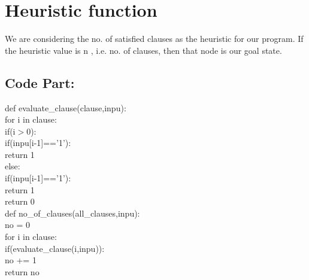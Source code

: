 \documentclass{article}
\begin{document}
\section{Heuristic function}
\vspace{10pt}
We are considering the no. of satisfied clauses as the heuristic for our program.
If the heuristic value is n , i.e. no. of clauses, then that node is our goal state.
\subsection*{Code Part:}
\vspace{5pt}
    def evaluate\_clause(clause,inpu):
        \vspace{2pt}
        \\ \hspace*{20pt}for i in clause:
        \vspace{2pt}
        \\ \hspace*{30pt}if(i$>$0):
        \vspace{2pt}
        \\ \hspace*{50pt} if(inpu[i-1]=='1'):
        \vspace{2pt}
        \\ \hspace*{70pt} return 1
        \vspace{2pt}
        \\ \hspace*{30pt} else:
        \vspace{2pt}
        \\ \hspace*{50pt} if(inpu[i-1]=='1'):
        \vspace{2pt}
        \\ \hspace*{70pt} return 1
        \vspace{2pt}
        \\ \hspace*{20pt} return 0
\vspace{15pt}
        \\def no\_of\_clauses(all\_clauses,inpu):
            \vspace{2pt}
            \\ \hspace*{20pt}no = 0
            \vspace{2pt}
            \\ \hspace*{20pt}for i in clause:
            \vspace{2pt}
            \\ \hspace*{30pt}if(evaluate\_clause(i,inpu)):
            \vspace{2pt}
            \\ \hspace*{50pt} no += 1
            \vspace{2pt}
            \\ \hspace*{20pt} return no
\newpage
\end{document}
